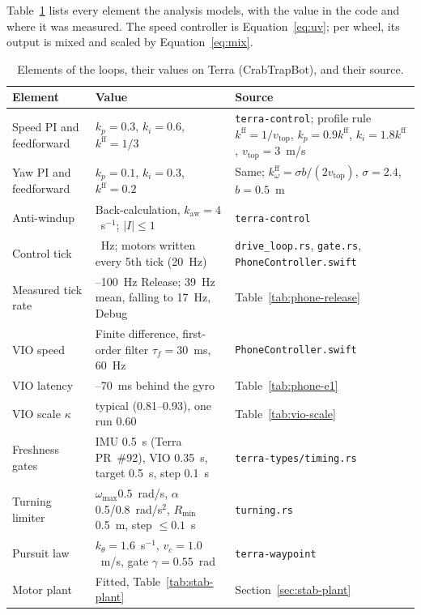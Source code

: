 Table~\ref{tab:stab-elements} lists every element the analysis models, with the value in the code and where it was measured.
The speed controller is Equation~\eqref{eq:uv}; per wheel, its output is mixed and scaled by Equation~\eqref{eq:mix}.

\begin{table}[ht]
\centering
\caption{Elements of the loops, their values on Terra (CrabTrapBot), and their source.}
\label{tab:stab-elements}
\small
\begin{tabularx}{\textwidth}{@{}>{\raggedright\arraybackslash}p{} >{\raggedright\arraybackslash}p{} X@{}}
\toprule
Element & Value & Source \\
\midrule
Speed PI and feedforward & $k_p = 0.3$, $k_i = 0.6$, $k^{\text{ff}} = 1/3$ & \texttt{terra-control}; profile rule $k^{\text{ff}} = 1/v_{\text{top}}$, $k_p = 0.9k^{\text{ff}}$, $k_i = 1.8k^{\text{ff}}$, $v_{\text{top}} = 3$~m/s \\
Yaw PI and feedforward & $k_p = 0.1$, $k_i = 0.3$, $k^{\text{ff}} = 0.2$ & Same; $k^{\text{ff}}_\omega = \sigma b/(2 v_{\text{top}})$, $\sigma = 2.4$, $b = 0.5$~m \\
Anti-windup & Back-calculation, $k_{\text{aw}} = 4$~s$^{-1}$; $|I| \le 1$ & \texttt{terra-control} \\
Control tick & 100~Hz; motors written every 5th tick (20~Hz) & \texttt{drive\_loop.rs}, \texttt{gate.rs}, \texttt{PhoneController.swift} \\
Measured tick rate & 96--100~Hz Release; 39~Hz mean, falling to 17~Hz, Debug & Table~\ref{tab:phone-release} \\
VIO speed & Finite difference, first-order filter $\tau_f = 30$~ms, 60~Hz & \texttt{PhoneController.swift} \\
VIO latency & 50--70~ms behind the gyro & Table~\ref{tab:phone-e1} \\
VIO scale $\kappa$ & 0.88 typical (0.81--0.93), one run 0.60 & Table~\ref{tab:vio-scale} \\
Freshness gates & IMU 0.5~s (Terra PR~\#92), VIO 0.35~s, target 0.5~s, step 0.1~s & \texttt{terra-types/timing.rs} \\
Turning limiter & $\omega_{\max} 0.5$~rad/s, $\alpha$ 0.5/0.8~rad/s$^2$, $R_{\min}$ 0.5~m, step $\le 0.1$~s & \texttt{turning.rs} \\
Pursuit law & $k_\theta = 1.6$~s$^{-1}$, $v_c = 1.0$~m/s, gate $\gamma = 0.55$~rad & \texttt{terra-waypoint} \\
Motor plant & Fitted, Table~\ref{tab:stab-plant} & Section~\ref{sec:stab-plant} \\
\bottomrule
\end{tabularx}
\end{table}

